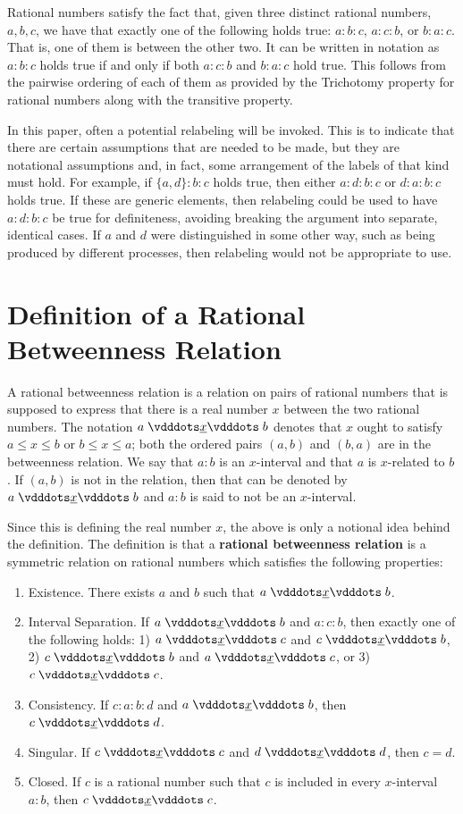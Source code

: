 \documentclass[12pt]{article}
\begin{document}
Rational numbers satisfy the fact that, given three distinct rational numbers, $a, b, c$, we have that exactly one of the following holds true: $a:b:c$, $a:c:b$, or $b:a:c$. That is, one of them is between the other two. It can be written in notation as $a:b:c$ holds true if and only if both \sout{$a:c:b$} and \sout{$b:a:c$} hold true. This follows from the pairwise ordering of each of them as provided by the Trichotomy property for rational numbers along with the transitive property. 

In this paper, often a potential relabeling will be invoked. This is to indicate that there are certain assumptions that are needed to be made, but they are notational assumptions and, in fact, some arrangement of the labels of that kind must hold. For example, if $\{a,d\}:b:c$ holds true, then either $a:d:b:c$ or $d:a:b:c$ holds true. If these are generic elements, then relabeling could be used to have $a:d:b:c$  be  true for definiteness, avoiding breaking the argument into separate, identical cases. If $a$ and $d$ were distinguished in some other way, such as being produced by different processes, then relabeling would not be appropriate to use. 

\section{Definition of a Rational Betweenness Relation}

A rational betweenness relation is a relation on pairs of rational numbers that is supposed to express that there is a real number $x$ between the two rational numbers. The notation $a \xrel b$ denotes that $x$ ought to satisfy $a \leq x \leq b$ or $b \leq x \leq a$;  both the ordered pairs $(a,b)$ and $(b,a)$ are in the betweenness relation. We say that $a:b$ is an $x$-interval and that $a$ is $x$-related to $b$. If $(a,b)$ is not in the relation, then that can be denoted by \sout{$a \xrel b$} and $a:b$ is said to not be an $x$-interval. 

Since this is defining the real number $x$, the above is only a notional idea behind the definition. The definition is that a \textbf{rational betweenness relation} is a symmetric relation on rational numbers 
which satisfies the following properties:
\begin{enumerate}
    \item Existence. There exists $a$ and $b$ such that $a\xrel b$.
    \item Interval Separation. If $a \xrel b$ and $a : c : b$, then exactly one of the following holds: 1) $a \xrel c$ and \sout{$c \xrel b$}, 2) $c \xrel b$ and \sout{$a \xrel c$}, or 3) $c \xrel c$. 
    \item Consistency. If $c : a : b : d$ and $a \xrel b$, then $c \xrel d$. 
    \item Singular. If $c \xrel c$ and $d \xrel d$, then $c=d$. 
    \item Closed. If $c$ is a rational number such that $c$ is included in every $x$-interval $a:b$, then  $c \xrel c$. 
\end{enumerate}
\end{document}
